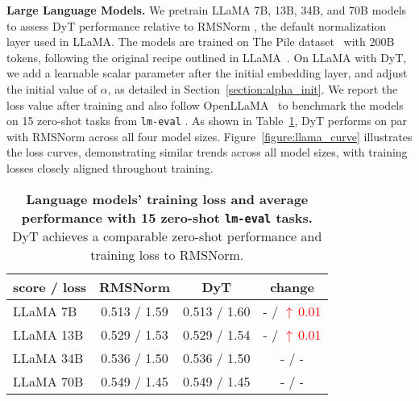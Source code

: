 \documentclass[]{fairmeta}
\newcommand{\tablestyle}[2]{\setlength{\tabcolsep}{#1}\renewcommand{\arraystretch}{#2}\centering\footnotesize}
\renewcommand{\paragraph}[1]{\vspace{1.25mm}\noindent\textbf{#1}}
\newcommand{\worseinv}[1]{\textcolor{red}{$\uparrow\,$#1}}
\begin{document}
\vskip -0.3in
\paragraph{Large Language Models.}
We pretrain LLaMA 7B, 13B, 34B, and 70B models~\citep{touvron2023llama, touvron2023llama2, dubey2024llama} to assess DyT performance relative to RMSNorm \citep{zhang2019root}, the default normalization layer used in LLaMA.
The models are trained on The Pile dataset~\citep{pile} with 200B tokens, following the original recipe outlined in LLaMA~\citep{touvron2023llama2}.
On LLaMA with DyT, we add a learnable scalar parameter after the initial embedding layer, and adjust the initial value of $\alpha$, as detailed in Section~\ref{section:alpha_init}.
We report the loss value after training and also follow OpenLLaMA~\citep{openlm2023openllama} to benchmark the models on 15 zero-shot tasks from \texttt{lm-eval} \citep{eval-harness}. As shown in Table~\ref{table:llama}, DyT performs on par with RMSNorm across all four model sizes. Figure~\ref{figure:llama_curve} illustrates the loss curves, demonstrating similar trends across all model sizes, with training losses closely aligned throughout training.


\begin{table}[h]
\centering
\tablestyle{10pt}{1.15}
\begin{tabular}{lccc}
\toprule
score / loss & RMSNorm & DyT &  change \\
\midrule
LLaMA 7B & 0.513 / 1.59 &  0.513 / 1.60 & - / \worseinv{0.01} \\
LLaMA 13B & 0.529 / 1.53 &  0.529 / 1.54 & - / \worseinv{0.01} \\
LLaMA 34B & 0.536 / 1.50 &  0.536 / 1.50 & - / - \\
LLaMA 70B & 0.549 / 1.45 &  0.549 / 1.45 & - / - \\
\midrule
\end{tabular}
\caption{\textbf{Language models' training loss and average performance with 15 zero-shot \texttt{lm-eval} tasks.} 
DyT achieves a comparable zero-shot performance and training loss to RMSNorm.}
\label{table:llama}
\end{table}
\end{document}
